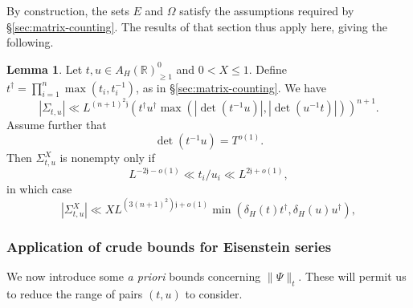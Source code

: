 \documentclass[reqno]{amsart}
\theoremstyle{plain} \newtheorem{theorem} {Theorem}
\theoremstyle{definition} \newtheorem{definition} [theorem] {Definition}
\theoremstyle{itplain} %
\newtheorem{lemma}[theorem]{Lemma}
\numberwithin{equation}{section}
\numberwithin{theorem}{section}
\renewcommand{\geq}{\geqslant}
\renewcommand{\leq}{\leqslant}
\begin{document}
By construction, the sets $E$ and $\Omega$ satisfy the assumptions required by \S\ref{sec:matrix-counting}.  The results of that section thus apply here, giving the following.

\begin{lemma}\label{lem:standard2:cool-counts-for-SIgma-t-u}
  Let $t, u \in A_H(\mathbb{R})^0_{\geq 1}$ and $0 < X \leq 1$.  Define $t ^\dagger = \prod_{i=1}^n \max(t_i, t_i^{-1})$, as in \S\ref{sec:matrix-counting}.  We have
  \begin{equation}\label{eq:sigma-ll-ln+12-a-priori}
    |\Sigma_{t,u}| \ll
    L^{(n+1)^2 \mathfrak{j}}
    \left( t ^\dagger u ^\dagger \max(|\det(t^{-1} u)|, |\det(u^{-1} t)|) \right)^{n+1}.
  \end{equation}
  Assume further that
  \begin{equation}\label{eq:dett-1-u-b}
    \det(t^{-1} u) = T^{o(1)}.
  \end{equation}
  Then $\Sigma_{t,u}^X$ is nonempty only if
  \begin{equation}\label{eq:d--frac2n+1}
    L^{-2 \mathfrak{j}  - o(1)} \ll t_i / u_i \ll L^{2 \mathfrak{j} +o(1)},
  \end{equation}
  in which case
  \begin{equation}\label{eq:sigma_r-sx-ll}
    |\Sigma_{t,u}^X| \ll X L ^{(3(n+1)^2) \mathfrak{j} + o(1)} \min(\delta_H(t) t^\dagger, \delta_H(u) u ^\dagger),
  \end{equation}
\end{lemma}

\subsubsection{Application of crude bounds for Eisenstein series}\label{sec:appl-crude-bounds}
We now introduce some \emph{a priori} bounds concerning $\|\Psi\|_t$.  These will permit us to reduce the range of pairs $(t,u)$ to consider.
\end{document}
